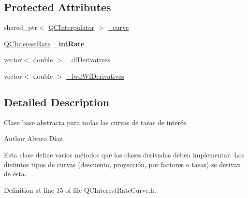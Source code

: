 \subsection*{Protected Attributes}
\begin{DoxyCompactItemize}
\item 
shared\+\_\+ptr$<$ \hyperlink{class_q_c_interpolator}{Q\+C\+Interpolator} $>$ \hyperlink{class_q_c_interest_rate_curve_af788dba3aafd45c2275e7f049df8f7ee}{\+\_\+curve}
\item 
\hypertarget{class_q_c_interest_rate_curve_a50f92300e3a22e662bdecd3c51ece386}{\hyperlink{class_q_c_interest_rate}{Q\+C\+Interest\+Rate} {\bfseries \+\_\+int\+Rate}}\label{class_q_c_interest_rate_curve_a50f92300e3a22e662bdecd3c51ece386}

\item 
vector$<$ double $>$ \hyperlink{class_q_c_interest_rate_curve_a654de5d23f8bb2b76df9edb70acf9fca}{\+\_\+df\+Derivatives}
\item 
vector$<$ double $>$ \hyperlink{class_q_c_interest_rate_curve_ae343e0126c675330a0fa15611db8428b}{\+\_\+fwd\+Wf\+Derivatives}
\end{DoxyCompactItemize}


\subsection{Detailed Description}
Clase base abstracta para todas las curvas de tasas de interés. 

\begin{DoxyAuthor}{Author}
Alvaro Díaz
\end{DoxyAuthor}
Esta clase define varios métodos que las clases derivadas deben implementar. Los distintos tipos de curvas (descuento, proyección, por factores o tasas) se derivan de ésta. 

Definition at line 15 of file Q\+C\+Interest\+Rate\+Curve.\+h.



